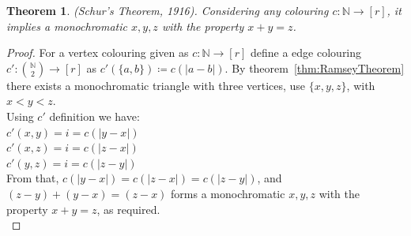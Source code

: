 \documentclass[12pt,twoside,a4paper]{book}
\numberwithin{equation}{section}
\newtheorem{theorem}             {Theorem}[section]
\theoremstyle{remark}
\begin{document}
\begin{theorem}\label{thm:Schur'sTheorem}
(Schur's Theorem, 1916). Considering any colouring $c\colon \mathbb{N} \rightarrow [r]$, it implies a monochromatic $x,y,z$ with the property $x+y=z$.
\end{theorem}
\begin{proof}
  For a vertex colouring  given as $c\colon \mathbb{N} \rightarrow [r]$ define a edge colouring $c'\colon \binom{\mathbb{N}}{2} \rightarrow [r]$ as $c'(\{a,b\}) \coloneqq c(|a-b|)$. By theorem~\ref{thm:RamseyTheorem} there exists a monochromatic triangle with three vertices, use $\{x,y,z\}$, with $x<y<z$.\\
Using $c'$ definition we have:\\
$c'({x,y}) = i = c(|y-x|)$\\
$c'({x,z})=  i = c(|z-x|)$\\
$c'({y,z}) = i = c(|z-y|)$\\
From that, $c(|y-x|) = c(|z-x|) = c(|z-y|)$, and $(z-y)+(y-x)=(z-x)$ forms a monochromatic $x,y,z$ with the property $x+y=z$, as required.\\
\end{proof}
\end{document}
